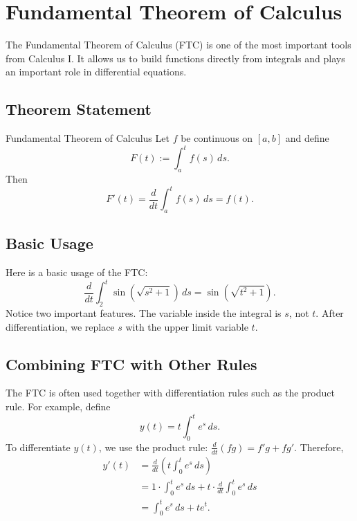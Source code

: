 \documentclass[11pt,letterpaper]{article}
\begin{document}
\section{Fundamental Theorem of Calculus}

The Fundamental Theorem of Calculus (FTC) is one of the most important tools from Calculus I. 
It allows us to build functions directly from integrals and plays an important role in differential equations.

\subsection{Theorem Statement}

\begin{theorem}{Fundamental Theorem of Calculus}
Let $f$ be continuous on $[a,b]$ and define
\[
F(t):=\int_a^t f(s)\,ds.
\]
Then
\[
F'(t)=\frac{d}{dt}\int_a^t f(s)\,ds = f(t).
\]
\end{theorem}

\subsection{Basic Usage}
Here is a basic usage of the FTC:
\[
\frac{d}{dt}\int_2^t \sin(\sqrt{s^2+1})\,ds
=
\sin(\sqrt{t^2+1}).
\]
Notice two important features. The variable inside the integral is $s$, not $t$. After differentiation, we replace $s$ with the upper limit variable $t$.



\subsection{Combining FTC with Other Rules}

The FTC is often used together with differentiation rules such as the product rule. For example, define
\[
y(t)= t\int_0^t e^s\,ds.
\]
To differentiate $y(t)$, we use the product rule: $\frac{d}{dt}(fg)=f'g+fg'$. Therefore,
\begin{align*}
y'(t)
&=
\frac{d}{dt}\left(t\int_0^t e^s\,ds\right)\\
&=
1\cdot \int_0^t e^s\,ds
+
t\cdot \frac{d}{dt}\int_0^t e^s\,ds\\
&=
\int_0^t e^s\,ds + te^t.
\end{align*}
\end{document}
